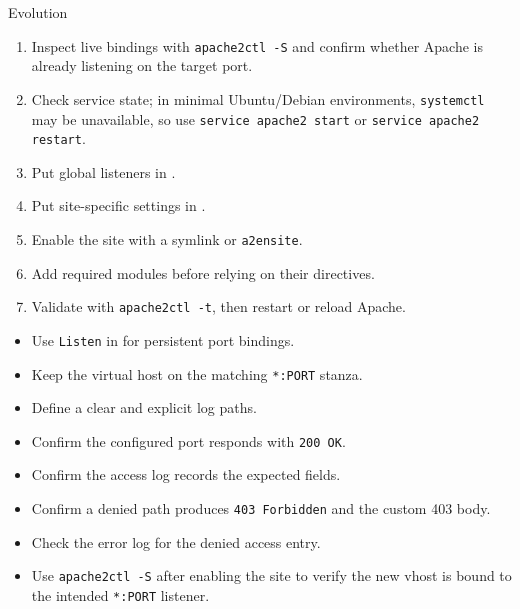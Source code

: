 \begin{svpromptbox}{Evolution}
\svpartsep
{}
\begin{enumerate}
    \item Inspect live bindings with \texttt{apache2ctl -S} and confirm whether Apache is already listening on the target port.
    \item Check service state; in minimal Ubuntu/Debian environments, \texttt{systemctl} may be unavailable, so use \texttt{service apache2 start} or \texttt{service apache2 restart}.
    \item Put global listeners in .
    \item Put site-specific settings in .
    \item Enable the site with a symlink or \texttt{a2ensite}.
    \item Add required modules before relying on their directives.
    \item Validate with \texttt{apache2ctl -t}, then restart or reload Apache.
\end{enumerate}
\begin{itemize}
    \item Use \texttt{Listen} in  for persistent port bindings.
    \item Keep the virtual host on the matching \texttt{*:PORT} stanza.
    \item Define a clear  and explicit log paths.
\end{itemize}
\begin{itemize}
    \item Confirm the configured port responds with \texttt{200 OK}.
    \item Confirm the access log records the expected fields.
    \item Confirm a denied path produces \texttt{403 Forbidden} and the custom 403 body.
    \item Check the error log for the denied access entry.
    \item Use \texttt{apache2ctl -S} after enabling the site to verify the new vhost is bound to the intended \texttt{*:PORT} listener.
\end{itemize}


\end{svpromptbox}
